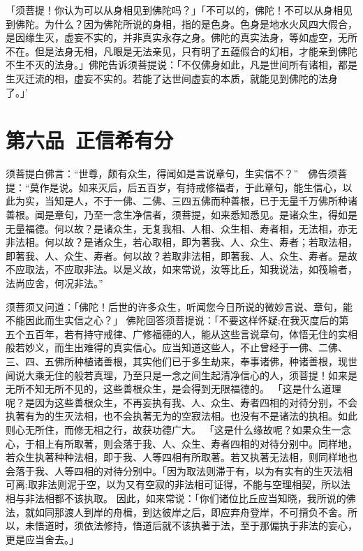 \documentclass[12pt,twoside,openany]{book}
\newcommand{\kai}[1]{{\CJKfamily{kai}#1}}
\begin{document}
\kai{「须菩提！你认为可以从身相见到佛陀吗？」「不可以的，佛陀！不可以从身相见到佛陀。为什么？因为佛陀所说的身相，指的是色身。色身是地水火风四大假合，是因缘生灭，虚妄不实的，并非真实永存之身。佛陀的真实法身，等如虚空，无所不在。但是法身无相，凡眼是无法亲见，只有明了五蕴假合的幻相，才能亲到佛陀不生不灭的法身。」佛陀告诉须菩提说：「不仅佛身如此，凡是世间所有诸相，都是生灭迁流的相，虚妄不实的。若能了达世间虚妄的本质，就能见到佛陀的法身了。」’}

\chapter{第六品\ 正信希有分}
须菩提白佛言：“世尊，颇有众生，得闻如是言说章句，生实信不？”　佛告须菩提：“莫作是说。如来灭后，后五百岁，有持戒修福者，于此章句，能生信心，以此为实，当知是人，不于一佛、二佛、三四五佛而种善根，已于无量千万佛所种诸善根。闻是章句，乃至一念生净信者，须菩提，如来悉知悉见。是诸众生，得如是无量福德。何以故？{\color{red}是诸众生，无复我相、人相、众生相、寿者相，无法相，亦无非法相。}何以故？是诸众生，若心取相，即为著我、人、众生、寿者；若取法相，即著我、人、众生、寿者。何以故？若取非法相，即著我、人、众生、寿者。是故不应取法，不应取非法。以是义故，如来常说，汝等比丘，知我说法，如筏喻者，法尚应舍，何况非法。”

\kai{须菩须又问道：「佛陀！后世的许多众生，听闻您今日所说的微妙言说、章句，能不能因此而生实信之心？」 佛陀回答须菩提说：「不要这样怀疑;在我灭度后的第五个五百年，若有持守戒律、广修福德的人，能从这些言说章句，体悟无住的实相般若妙义，而生出难得的真实信心。应当知道这些人，不止曾经于一佛、二佛、三、四、五佛所种植诸善根，其实他们已于多生劫来，奉事诸佛，种诸善根，现世闻说大乘无住的般若真理，乃至只是一念之间生起清净信心的人，须菩提！如来是无所不知无所不见的，这些善根众生，是会得到无限福德的。 「这是什么道理呢？是因为这些善根众生，不再妄执有我、人、众生、寿者四相的对待分别，不会执著有为的生灭法相，也不会执著无为的空寂法相。也没有不是诸法的执相。如此则心无所住，而修无相之行，故获功德广大。 「这是什么缘故呢？如果众生一念心，于相上有所取著，则会落于我、人、众生、寿者四相的对待分别中。同样地，若众生执著种种法相，即于我、人等四相有所取著。若又执著无法相，则同样地也会落于我、人等四相的对待分别中。「因为取法则滞于有，以为有实有的生灭法相可离;取非法则泥于空，以为又有空寂的非法相可证得，不能与空理相契，所以法相与非法相都不该执取。 因此，如来常说：「你们诸位比丘应当知晓，我所说的佛法，就如同那渡人到岸的舟楫，到达彼岸之后，即应弃舟登岸，不可揹负不舍。所以，未悟道时，须依法修持，悟道后就不该执著于法，至于那偏执于非法的妄心，更是应当舍去。」}
\end{document}
